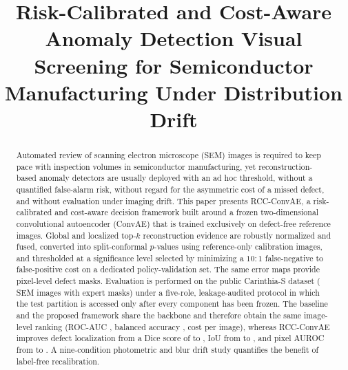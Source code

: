 \documentclass[conference]{IEEEtran}
\begin{document}
\title{Risk-Calibrated and Cost-Aware Anomaly Detection Visual Screening for Semiconductor Manufacturing Under Distribution Drift}

\author{
\and
{}
}

\maketitle

\begin{abstract}
Automated review of scanning electron microscope (SEM) images is required to keep pace with inspection volumes in semiconductor manufacturing, yet reconstruction-based anomaly detectors are usually deployed with an ad hoc threshold, without a quantified false-alarm risk, without regard for the asymmetric cost of a missed defect, and without evaluation under imaging drift. This paper presents RCC-ConvAE, a risk-calibrated and cost-aware decision framework built around a frozen two-dimensional convolutional autoencoder (ConvAE) that is trained exclusively on defect-free reference images. Global and localized top-$k$ reconstruction evidence are robustly normalized and fused, converted into split-conformal $p$-values using reference-only calibration images, and thresholded at a significance level selected by minimizing a $10{:}1$ false-negative to false-positive cost on a dedicated policy-validation set. The same error maps provide pixel-level defect masks. Evaluation is performed on the public Carinthia-S dataset (\NImages{} SEM images with expert masks) under a five-role, leakage-audited protocol in which the test partition is accessed only after every component has been frozen. The baseline and the proposed framework share the backbone and therefore obtain the same image-level ranking (ROC-AUC \PtwoAUC{}, balanced accuracy \PtwoBA{}, cost \PtwoCost{} per image), whereas RCC-ConvAE improves defect localization from a Dice score of \PoneDice{} to \PtwoDice{}, IoU from \PoneIoU{} to \PtwoIoU{}, and pixel AUROC from \PonePixAUC{} to \PtwoPixAUC{}. A nine-condition photometric and blur drift study quantifies the benefit of label-free recalibration.
\end{abstract}
\end{document}
